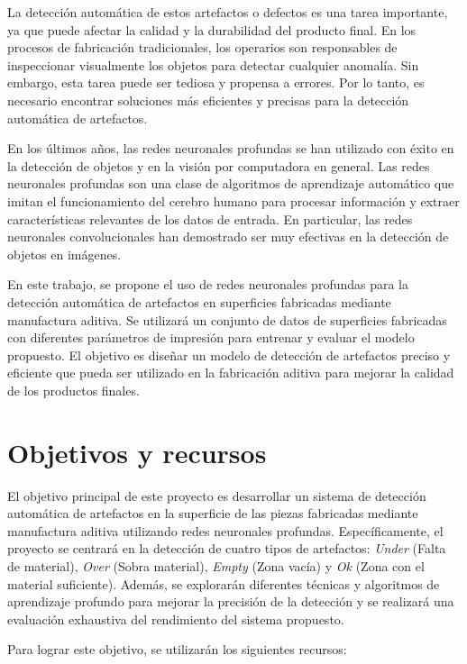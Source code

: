 \documentclass{report}
\begin{document}
La detección automática de estos artefactos o defectos es una tarea importante, ya que puede afectar la calidad y la durabilidad del producto final. En los procesos de fabricación tradicionales, los operarios son responsables de inspeccionar visualmente los objetos para detectar cualquier anomalía. Sin embargo, esta tarea puede ser tediosa y propensa a errores. Por lo tanto, es necesario encontrar soluciones más eficientes y precisas para la detección automática de artefactos.

En los últimos años, las redes neuronales profundas se han utilizado con éxito en la detección de objetos y en la visión por computadora en general. Las redes neuronales profundas son una clase de algoritmos de aprendizaje automático que imitan el funcionamiento del cerebro humano para procesar información y extraer características relevantes de los datos de entrada. En particular, las redes neuronales convolucionales han demostrado ser muy efectivas en la detección de objetos en imágenes.

En este trabajo, se propone el uso de redes neuronales profundas para la detección automática de artefactos en superficies fabricadas mediante manufactura aditiva. Se utilizará un conjunto de datos de superficies fabricadas con diferentes parámetros de impresión para entrenar y evaluar el modelo propuesto. El objetivo es diseñar un modelo de detección de artefactos preciso y eficiente que pueda ser utilizado en la fabricación aditiva para mejorar la calidad de los productos finales.


\section{Objetivos y recursos}

El objetivo principal de este proyecto es desarrollar un sistema de detección automática de artefactos en la superficie de las piezas fabricadas mediante manufactura aditiva utilizando redes neuronales profundas. Específicamente, el proyecto se centrará en la detección de cuatro tipos de artefactos: \textit{Under} (Falta de material), \textit{Over} (Sobra material), \textit{Empty} (Zona vacía) y \textit{Ok} (Zona con el material suficiente). Además, se explorarán diferentes técnicas y algoritmos de aprendizaje profundo para mejorar la precisión de la detección y se realizará una evaluación exhaustiva del rendimiento del sistema propuesto.

Para lograr este objetivo, se utilizarán los siguientes recursos:
\end{document}
